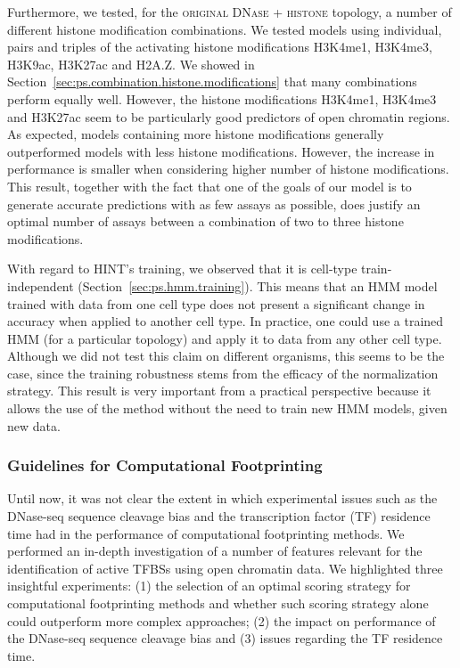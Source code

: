 Furthermore, we tested, for the \textsc{original DNase + histone} topology, a number of different histone modification combinations. We tested models using individual, pairs and triples of the activating histone modifications H3K4me1, H3K4me3, H3K9ac, H3K27ac and H2A.Z. We showed in Section~\ref{sec:ps.combination.histone.modifications} that many combinations perform equally well. However, the histone modifications H3K4me1, H3K4me3 and H3K27ac seem to be particularly good predictors of open chromatin regions. As expected, models containing more histone modifications generally outperformed models with less histone modifications. However, the increase in performance is smaller when considering higher number of histone modifications. This result, together with the fact that one of the goals of our model is to generate accurate predictions with as few assays as possible, does justify an optimal number of assays between a combination of two to three histone modifications.

With regard to HINT's training, we observed that it is cell-type train-independent (Section~\ref{sec:ps.hmm.training}). This means that an HMM model trained with data from one cell type does not present a significant change in accuracy when applied to another cell type. In practice, one could use a trained HMM (for a particular topology) and apply it to data from any other cell type. Although we did not test this claim on different organisms, this seems to be the case, since the training robustness stems from the efficacy of the normalization strategy. This result is very important from a practical perspective because it allows the use of the method without the need to train new HMM models, given new data.

\subsubsection{Guidelines for Computational Footprinting}

Until now, it was not clear the extent in which experimental issues such as the DNase-seq sequence cleavage bias and the transcription factor (TF) residence time had in the performance of computational footprinting methods. We performed an in-depth investigation of a number of features relevant for the identification of active TFBSs using open chromatin data. We highlighted three insightful experiments: (1) the selection of an optimal scoring strategy for computational footprinting methods and whether such scoring strategy alone could outperform more complex approaches; (2) the impact on performance of the DNase-seq sequence cleavage bias and (3) issues regarding the TF residence time.

